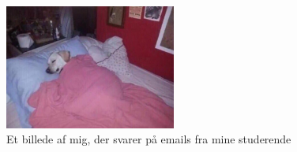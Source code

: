 

\begin{figure}[htbp]
  \centering
  \includegraphics[width=0.5\textwidth]{fig/img/me.jpg}
  \caption{Et billede af mig, der svarer på emails fra mine studerende}
  \label{fig:me}
\end{figure}
